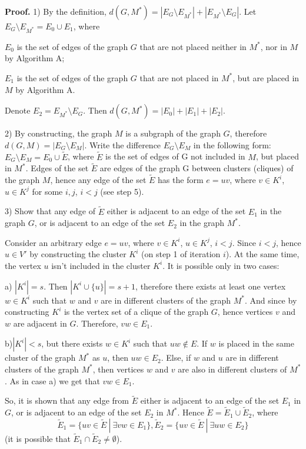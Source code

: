 \documentclass[runningheads]{llncs}
\begin{document}
\textbf{Proof.}
1) By the definition, $d(G,M^*) = |E_G \setminus E_{M^*}| + |E_{M^*} \setminus E_G|$.
Let $E_G \setminus E_{M^*} = E_0 \cup E_1$, where
 
$E_0$ is the set of edges of the graph $G$ that are not placed neither 
in $M^*$, nor in $M$ by Algorithm A;
 
$E_1$ is the set of edges of the graph $G$ that are not placed in $M^*$, 
but are placed in $M$ by Algorithm A.

Denote $E_2 = E_{M^*} \setminus E_G$. Then $d(G,M^*) = |E_0| + |E_1| + |E_2|$.

2) By constructing, the graph $M$ is a subgraph of the graph $G$, 
therefore $d(G,M) = |E_G \setminus E_M|$.
Write the difference $E_G \setminus E_M$ in the following form: 
$E_G \setminus E_M = E_0 \cup \tilde{E}$, where $\tilde{E}$ is the set 
of edges of G not included in $M$, but placed in $M^*$. 
Edges of the set $\tilde{E}$ are edges of the graph G between clusters (cliques) 
of the graph $M$, hence any edge of the set $\tilde{E}$ has the form 
$e = uv$, where $v \in K^i$, $u \in K^j$ for some $i,j$, $i < j$ 
(see step 5).

3) Show that any edge of $\tilde{E}$ either is adjacent to an edge 
of the set $E_1$ in the graph $G$, or is adjacent to an edge of the 
set $E_2$ in the graph $M^*$.

Consider an arbitrary edge $e = uv$, where $v \in K^i$, $u \in K^j$, $i < j$. 
Since $i < j$, hence $u \in V'$ by constructing the cluster $K^i$ (on step 1 
of iteration $i$). At the same time, the vertex $u$ isn't included in the cluster 
$K^i$. It is possible only in two cases:

a) $|K^i| = s$. Then $|K^i \cup \{u\}| = s + 1$, therefore there exists 
at least one vertex $w \in K^i$ such that $w$ and $v$ are 
in different clusters of the graph $M^*$. And since by constructing 
$K^i$ is the vertex set of a clique of the graph $G$, hence vertices 
$v$ and $w$ are adjacent in $G$. Therefore, $vw \in E_1$.

b)$|K^i| < s$, but there exists $w \in K^i$ such that $uw \notin E$. If 
$w$ is placed in the same cluster of the graph $M^*$ as $u$, then $uw\in E_2$. 
Else, if $w$ and $u$ are in different clusters of the graph $M^*$, 
then vertices $w$ and $v$ are also in different clusters of $M^*$. 
As in case a) we get that $vw \in E_1$.

So, it is shown that any edge from $\tilde{E}$ either is adjacent to
an edge of the set $E_1$ in $G$, or is adjacent to an edge of the set 
$E_2$ in $M^*$. 
Hence $\tilde{E} = \tilde{E}_1 \cup \tilde{E}_2$, where
$$
\tilde{E}_1 = \{uv \in \tilde{E} \ | \ \exists vw\in E_1\}, 
\tilde{E}_2 = \{uv \in \tilde{E} \ | \ \exists uw\in E_2\}
$$
(it is possible that $\tilde{E}_1 \cap \tilde{E}_2 \neq \emptyset$).
\end{document}
